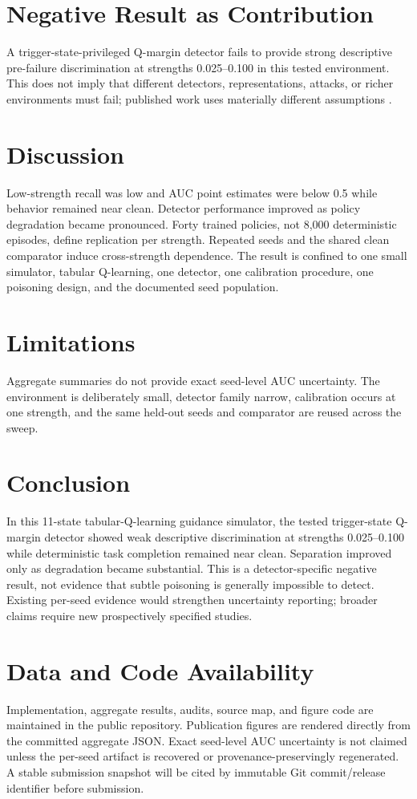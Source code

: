 \documentclass{ieeeaccess}
\begin{document}
\section{Negative Result as Contribution} A trigger-state-privileged Q-margin detector fails to provide strong descriptive pre-failure discrimination at strengths 0.025--0.100 in this tested environment. This does not imply that different detectors, representations, attacks, or richer environments must fail; published work uses materially different assumptions \cite{zhang2020adaptive,rakhsha2020policy,nika2023online,rathbun2025adversarial}.
\section{Discussion} Low-strength recall was low and AUC point estimates were below 0.5 while behavior remained near clean. Detector performance improved as policy degradation became pronounced. Forty trained policies, not 8,000 deterministic episodes, define replication per strength. Repeated seeds and the shared clean comparator induce cross-strength dependence. The result is confined to one small simulator, tabular Q-learning, one detector, one calibration procedure, one poisoning design, and the documented seed population.
\section{Limitations} Aggregate summaries do not provide exact seed-level AUC uncertainty. The environment is deliberately small, detector family narrow, calibration occurs at one strength, and the same held-out seeds and comparator are reused across the sweep.
\section{Conclusion} In this 11-state tabular-Q-learning guidance simulator, the tested trigger-state Q-margin detector showed weak descriptive discrimination at strengths 0.025--0.100 while deterministic task completion remained near clean. Separation improved only as degradation became substantial. This is a detector-specific negative result, not evidence that subtle poisoning is generally impossible to detect. Existing per-seed evidence would strengthen uncertainty reporting; broader claims require new prospectively specified studies.
\section*{Data and Code Availability} Implementation, aggregate results, audits, source map, and figure code are maintained in the public repository. Publication figures are rendered directly from the committed aggregate JSON. Exact seed-level AUC uncertainty is not claimed unless the per-seed artifact is recovered or provenance-preservingly regenerated. A stable submission snapshot will be cited by immutable Git commit/release identifier before submission.
\end{document}
